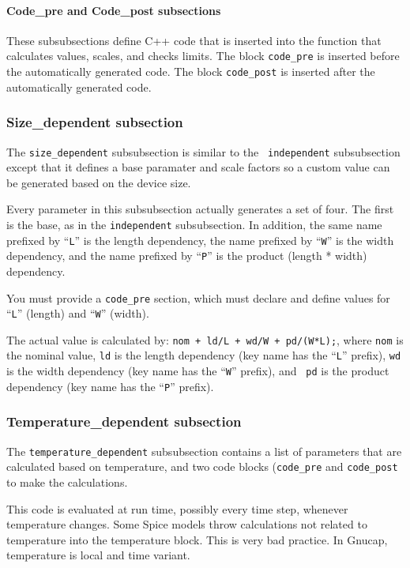 \paragraph{Code\_pre and Code\_post subsections}

These subsubsections define C++ code that is inserted into the
function that calculates values, scales, and checks limits.  The block
{\tt code\_pre} is inserted before the automatically generated code.
The block {\tt code\_post} is inserted after the automatically
generated code.
\subsubsection{Size\_dependent subsection}

The {\tt size\_dependent} subsubsection is similar to the {\tt
independent} subsubsection except that it defines a base paramater and
scale factors so a custom value can be generated based on the device
size.

Every parameter in this subsubsection actually generates a set of
four.  The first is the base, as in the {\tt independent}
subsubsection.  In addition, the same name prefixed by ``{\tt L}'' is
the length dependency, the name prefixed by ``{\tt W}'' is the width
dependency, and the name prefixed by ``{\tt P}'' is the product
(length * width) dependency.

You must provide a {\tt code\_pre} section, which must declare and
define values for ``{\tt L}'' (length) and ``{\tt W}'' (width).

The actual value is calculated by: {\tt nom + ld/L + wd/W +
pd/(W*L);}, where {\tt nom} is the nominal value, {\tt ld} is the
length dependency (key name has the ``{\tt L}'' prefix), {\tt wd} is
the width dependency (key name has the ``{\tt W}'' prefix), and {\tt
pd} is the product dependency (key name has the ``{\tt P}'' prefix).
\subsubsection{Temperature\_dependent subsection}

The {\tt temperature\_dependent} subsubsection contains a list of
parameters that are calculated based on temperature, and two code
blocks ({\tt code\_pre} and {\tt code\_post} to make the calculations.

This code is evaluated at run time, possibly every time step, whenever
temperature changes.  Some Spice models throw calculations not related
to temperature into the temperature block.  This is very bad practice.
In Gnucap, temperature is local and time variant.
